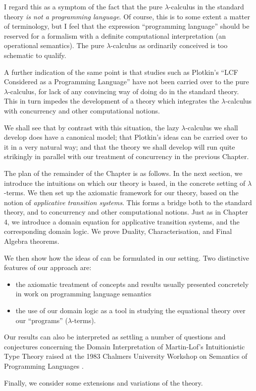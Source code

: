 I regard this as a symptom of the fact that the pure $\lambda$-calculus in 
the standard theory {\em is not a programming language}. 
Of course, this is to some extent a matter of terminology, but I feel that 
the expression ``programming language'' should be reserved for a formalism 
with a definite computational interpretation (an operational semantics). 
The pure $\lambda$-calculus as ordinarily conceived is too schematic to qualify.

A further indication of the same point is that studies such as Plotkin's 
``LCF Considered as a Programming Language'' \cite{Plo77} have not been 
carried over to the pure $\lambda$-calculus, for lack of any convincing way of 
doing do in the standard theory. 
This in turn impedes the development of a theory which integrates the 
$\lambda$-calculus with concurrency and other computational notions.

We shall see that by contrast with this situation, the lazy $\lambda$-calculus 
we shall develop does have a canonical model; that Plotkin's ideas can be 
carried over to it in a very natural way; 
and that the theory we shall develop will run quite strikingly in parallel 
with our treatment of concurrency in the previous Chapter.

The plan of the remainder of the Chapter is as follows. 
In the next section, we introduce the intuitions on which our theory is based, 
in the concrete setting of $\lambda$-terms. 
We then set up the axiomatic framework for our theory, 
based on the notion of {\em applicative transition systems}. 
This forms a bridge both to the standard theory, and to concurrency and other 
computational notions. 
Just as in Chapter 4, we introduce a domain equation for applicative 
transition systems, and the corresponding domain logic. 
We prove Duality, Characterisation, and Final Algebra theorems.

We then show how the ideas of \cite{Plo77} can be formulated in our setting. 
Two distinctive features of our approach are:
\begin{itemize}
\item the axiomatic treatment of concepts and results usually presented 
concretely in work on programming language semantics
\item the use of our domain logic as a tool in studying the equational theory 
over our ``programs'' ($\lambda$-terms).
\end{itemize}
Our results can also be interpreted as settling a number of questions and 
conjectures concerning the Domain Interpretation of Martin-Lof's 
Intuitionistic Type Theory raised at the 1983 Chalmers University Workshop on 
Semantics of Programming Languages \cite{Cha83}.

Finally, we consider some extensions and variations of the theory.
